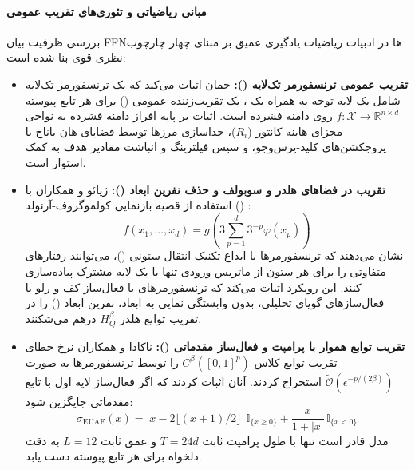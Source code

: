 \paragraph*{مبانی ریاضیاتی و تئوری‌های تقریب عمومی}
بررسی ظرفیت بیان FFNها در ادبیات ریاضیات یادگیری عمیق بر مبنای چهار چارچوب نظری قوی بنا شده است:
\begin{itemize}
    \item \textbf{تقریب عمومی ترنسفورمر تک‌لایه ():} جمان \cite{gumaan2025universal} اثبات می‌کند که یک ترنسفورمر تک‌لایه شامل یک لایه توجه به همراه یک ، یک تقریب‌زننده عمومی () برای هر تابع پیوسته $f: \mathcal{X} \to \mathbb{R}^{n \times d}$ روی دامنه فشرده است. اثبات بر پایه افراز دامنه فشرده به نواحی مجزای هاینه-کانتور ($R_i$)، جداسازی مرزها توسط قضایای هان-باناخ با پروجکشن‌های کلید-پرس‌وجو، و سپس فیلترینگ و انباشت مقادیر هدف به کمک  استوار است.
    
    \item \textbf{تقریب در فضاهای هلدر و سوبولف و حذف نفرین ابعاد ():} ژیائو و همکاران \cite{jiao2025transformers} با استفاده از قضیه بازنمایی کولموگروف-آرنولد () \cite{schmidt2021kolmogorov}:
    \begin{equation}
        f(x_1, \dots, x_d) = g\left(3 \sum_{p=1}^d 3^{-p} \varphi(x_p)\right)
    \end{equation}
    نشان می‌دهند که ترنسفورمرها با ابداع تکنیک انتقال ستونی ()، می‌توانند رفتارهای متفاوتی را برای هر ستون از ماتریس ورودی تنها با یک لایه  مشترک پیاده‌سازی کنند. این رویکرد اثبات می‌کند که ترنسفورمرهای با فعال‌ساز کف و رلو یا فعال‌ساز‌های گویای تحلیلی، بدون وابستگی نمایی به ابعاد، نفرین ابعاد () را در تقریب توابع هلدر $H_Q^\beta$ درهم می‌شکنند.
    
    \item \textbf{تقریب توابع هموار با پرامپت و فعال‌ساز مقدماتی ():} ناکادا و همکاران \cite{nakada2025prompt} نرخ خطای تقریب توابع کلاس $C^\beta([0, 1]^p)$ را توسط ترنسفورمرها به صورت $\tilde{\mathcal{O}}(\epsilon^{-p/(2\beta)})$ استخراج کردند. آنان اثبات کردند که اگر فعال‌ساز لایه اول با تابع مقدماتی  \cite{zhang2022euaf} جایگزین شود:
    \begin{equation}
        \sigma_{\text{EUAF}}(x) = |x - 2\lfloor(x+1)/2\rfloor|\,\mathbb{I}_{\{x \ge 0\}} + \frac{x}{1+|x|}\,\mathbb{I}_{\{x < 0\}}
    \end{equation}
    مدل قادر است تنها با طول پرامپت ثابت $T = 24d$ و عمق ثابت $L = 12$ به دقت دلخواه برای هر تابع پیوسته دست یابد.
    

\end{itemize}
